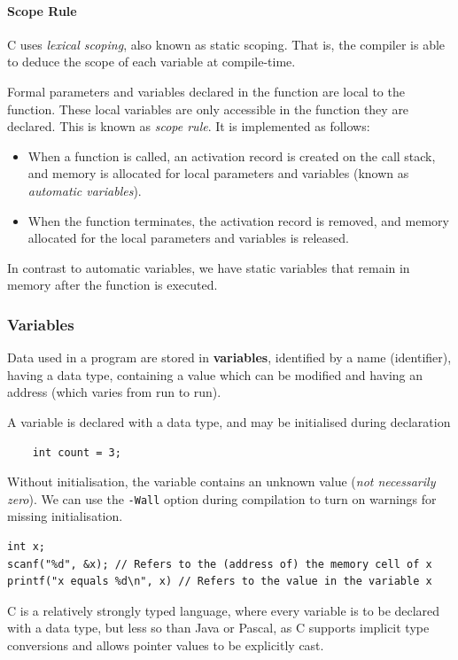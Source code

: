 \paragraph{Scope Rule}
\begin{definition}
  C uses \textit{lexical scoping}, also known as static scoping. That is, the
  compiler is able to deduce the scope of each variable at compile-time.
\end{definition}
Formal parameters and variables declared in the function are local to the
function. These local variables are only accessible in the function they are
declared. This is known as \textit{scope rule}. It is implemented as follows:
\begin{itemize}
  \item When a function is called, an activation record is created on the call
    stack, and memory is allocated for local parameters and variables (known as
    \textit{automatic variables}).
  \item When the function terminates, the activation record is removed, and
    memory allocated for the local parameters and variables is released.
\end{itemize}
In contrast to automatic variables, we have static variables that remain in
memory after the function is executed.

\subsubsection{Variables}
Data used in a program are stored in \textbf{variables}, identified by a name
(identifier), having a data type, containing a value which can be modified and
having an address (which varies from run to run).
\begin{remark}
  A variable is declared with a data type, and may be initialised during declaration
  \begin{lstlisting}
    int count = 3;
  \end{lstlisting}
  Without initialisation, the variable contains an unknown value (\textit{not
  necessarily zero}). We can use the \verb|-Wall| option during compilation to
  turn on warnings for missing initialisation.
\end{remark}
\begin{lstlisting}
int x;
scanf("%d", &x); // Refers to the (address of) the memory cell of x
printf("x equals %d\n", x) // Refers to the value in the variable x
\end{lstlisting}
C is a relatively strongly typed language, where every variable is to be
declared with a data type, but less so than Java or Pascal, as C supports
implicit type conversions and allows pointer values to be explicitly cast.
